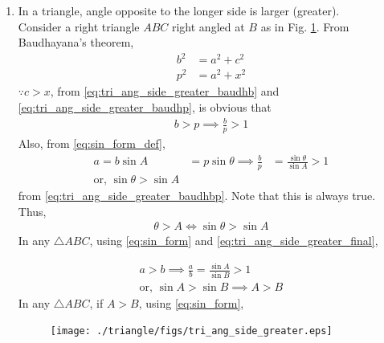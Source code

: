 \begin{enumerate}[label=\arabic*.,ref=\thesubsection.\theenumi]
\item  In a triangle, angle opposite to the longer side is larger (greater). 
%
\label{prob:tri_ang_side_greater}
%
\\
\solution Consider a right triangle $ABC$ right angled at $B$ as in Fig. \ref{fig:tri_ang_side_greater}.  From Baudhayana's theorem, 
%
\begin{align}
\label{eq:tri_ang_side_greater_baudhb}
b^2 &= a^2+c^2
\\
p^2 &= a^2+x^2
\label{eq:tri_ang_side_greater_baudhp}
\end{align}
%
$\because c > x$, from \eqref{eq:tri_ang_side_greater_baudhb} and \eqref{eq:tri_ang_side_greater_baudhp}, is obvious that %
\begin{align}
\label{eq:tri_ang_side_greater_baudhbp}
b > p \implies \frac{b}{p} > 1
\end{align}
%
Also, from \eqref{eq:sin_form_def},
%
%
\begin{align}
a = b\sin A &= p \sin \theta 
\implies \frac{b}{p} &= \frac{\sin \theta}{\sin A} > 1
\\
\text{or, } \sin \theta > \sin A
\end{align}
%
from \eqref{eq:tri_ang_side_greater_baudhbp}.   Note that this is always true.  Thus, 
%
\begin{align}
\label{eq:tri_ang_side_greater_final}
\theta > A \iff \sin \theta > \sin A
\end{align}
%
In any $\triangle ABC$,  using \eqref{eq:sin_form} and \eqref{eq:tri_ang_side_greater_final},

%
%
\begin{align}
a>b \implies \frac{a}{b} = \frac{\sin A}{\sin B} > 1 
\\
\text{or, }  \sin A > \sin B \implies A > B
\end{align}
%
In any $\triangle ABC$, if $A>B$, using \eqref{eq:sin_form},
%
\begin{figure}[!ht]
\texttt{[image: ./triangle/figs/tri\_ang\_side\_greater.eps]}
\caption{}
\label{fig:tri_ang_side_greater}
\end{figure}
%


\end{enumerate}
